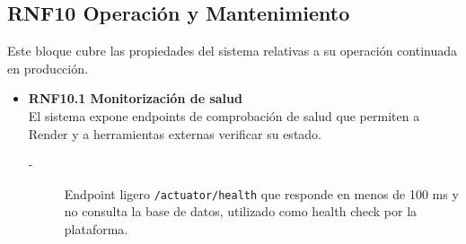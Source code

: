 \subsection{RNF10 Operación y Mantenimiento}
Este bloque cubre las propiedades del sistema relativas a su operación
continuada en producción.
\begin{itemize}
    \item \textbf{RNF10.1 Monitorización de salud} \\
    El sistema expone endpoints de comprobación de salud que permiten
    a Render y a herramientas externas verificar su estado.
    \begin{description}
        \item[-] Endpoint ligero \texttt{/actuator/health} que responde en menos de 100
        ms y no consulta la base de datos, utilizado como health check por la plataforma. 
    \end{description}



\end{itemize}
